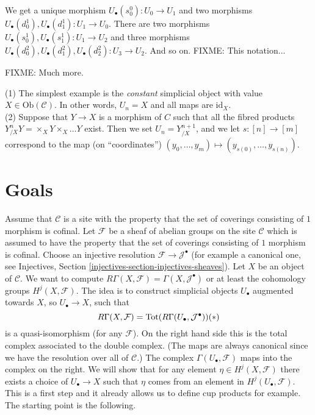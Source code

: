 \noindent
We get a unique morphism $U_\bullet(s^0_0) : U_0 \to U_1$ and
two morphisms $U_\bullet(d^1_0), U_\bullet(d^1_1) : U_1 \to U_0$.
There are two morphisms $U_\bullet(s^1_0), U_\bullet(s^1_1) :
U_1 \to U_2$ and three morphisms $U_\bullet(d^2_0), 
U_\bullet(d^2_1), U_\bullet(d^2_2) : U_3 \to U_2$. And so on.
FIXME: This notation...

\medskip\noindent
FIXME: Much more.

\begin{example}
\label{example-simplicial-products}
(1) The simplest example is the {\it constant} simplicial object with
value $X \in \text{Ob}(\mathcal{C})$. In other words, $U_n=X$ and
all maps are $\text{id}_X$. \\
(2) Suppose that $Y\to X$ is a morphism of $C$ such that all
the fibred products $Y_{/X}^nY = \times_X Y \times_X \ldots Y$ exist.
Then we set $U_n = Y^{n+1}_{/X}$, and we let $s: [n] \to [m]$
correspond to the map (on ``coordinates'') $(y_0,\ldots, y_m) 
\mapsto (y_{s(0)},\ldots, y_{s(n)})$.
\end{example}

\section{Goals}

\noindent
Assume that $\mathcal{C}$ is a site with the property
that the set of coverings consisting of $1$ morphism is cofinal.
Let $\mathcal{F}$ be a sheaf of abelian groups on
the site $\mathcal{C}$ which is assumed to have the property
that the set of coverings consisting of $1$ morphism is cofinal.
Choose an injective resolution $\mathcal{F} \to \mathcal{J}^\bullet$
(for example a canonical one, see 
Injectives, Section \ref{injectives-section-injectives-sheaves}).
Let $X$ be an object of $\mathcal{C}$. We want to compute 
$R\Gamma(X, \mathcal{F}) = \Gamma(X, \mathcal{J}^\bullet)$
or at least the cohomology groups $H^j(X, \mathcal{F})$.
The idea is to construct simplicial objects $U_\bullet$ 
augmented towards $X$, so $U_\bullet \to X$, such that 
$$
R\Gamma(X, \mathcal{F}) 
= \text{Tot}(R\Gamma(U_\bullet, \mathcal{J}^\bullet))
\relax{(*)}
$$
is a quasi-isomorphism (for any $\mathcal{F}$). On the right hand 
side this is the total complex associated to the double complex. 
(The maps are always canonical since we have the resolution over 
all of $\mathcal{C}$.)
The complex $\Gamma(U_\bullet, \mathcal{F})$ maps into the
complex on the right. We will show that for any
element $\eta \in H^j(X, \mathcal{F})$ there exists a choice
of $U_\bullet \to X$ such that $\eta$ comes from an element
in $H^j(U_\bullet, \mathcal{F})$. This is a first step and
it already allows us to define cup products for example.
The starting point is the following.

